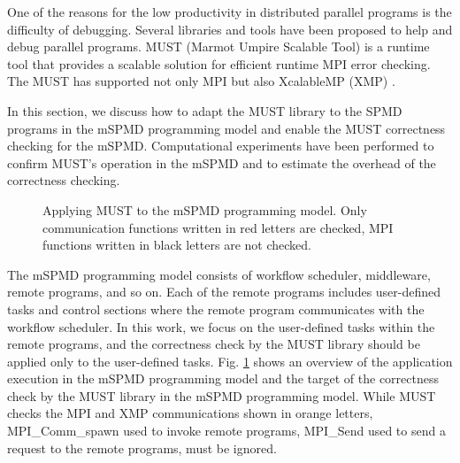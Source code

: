 \documentclass[graybox]{svmult}
\begin{document}
One of the reasons for the low productivity in distributed parallel programs is the difficulty of debugging. 
Several libraries and tools have been proposed to help and debug parallel programs.
MUST (Marmot Umpire Scalable Tool) \cite{MUST-project,Hilbrich2012must,Hilbrich2013must} is a runtime tool that provides a scalable solution for efficient runtime MPI error checking. The MUST has supported not only MPI but also XcalableMP (XMP) \cite{Protze2017a}. 

In this section, we discuss how to adapt the MUST library to the SPMD programs in the mSPMD programming model and enable the MUST correctness checking for the mSPMD.
Computational experiments have been performed to confirm MUST's operation in the mSPMD and to estimate the overhead of the correctness checking.

\begin{figure}[t]
 \begin{center}
\caption{
Applying MUST to the mSPMD programming model.
Only communication functions written in red letters are checked, MPI functions written in black letters are not checked.
}
\label{fig:must-target}
 \end{center}
\end{figure}

The mSPMD programming model consists of workflow scheduler, middleware, remote programs, and so on. 
Each of the remote programs includes user-defined tasks and control sections where the remote program communicates with the workflow scheduler. 
In this work, we focus on the user-defined tasks within the remote programs, and the correctness check by the MUST library should be applied only to the user-defined tasks. Fig. \ref{fig:must-target} shows an overview of the application execution in the mSPMD programming model and the target of the correctness check by the MUST library in the mSPMD programming model. While MUST checks the MPI and XMP communications shown in orange letters, MPI\_Comm\_spawn used to invoke remote programs, MPI\_Send used to send a request to the remote programs, must be ignored.
\end{document}
